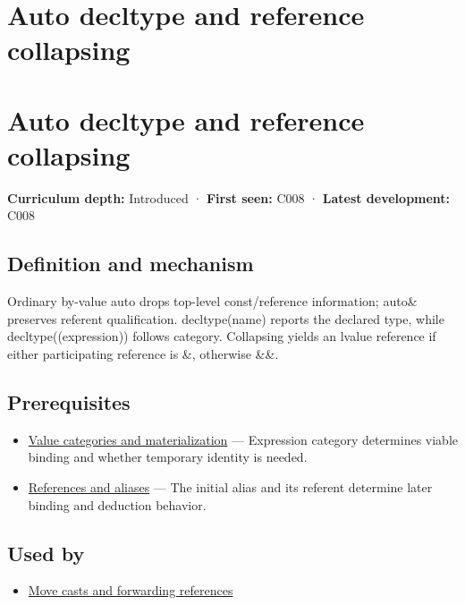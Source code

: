 \hypertarget{appendix-5d4252a42886}{}
\section*{Auto decltype and reference collapsing}
\section{Auto decltype and reference collapsing}\label{auto-decltype-and-reference-collapsing}

\textbf{Curriculum depth:} Introduced · \textbf{First seen:} C008 · \textbf{Latest development:} C008

\subsection{Definition and mechanism}\label{definition-and-mechanism}

Ordinary by-value auto drops top-level const/reference information; auto\& preserves referent qualification. decltype(name) reports the declared type, while decltype((expression)) follows category. Collapsing yields an lvalue reference if either participating reference is \&, otherwise \&\&.

\subsection{Prerequisites}\label{prerequisites}

\begin{itemize}
\tightlist
\item
  \hyperref[appendix-1121b30eaeb0]{Value categories and materialization} --- Expression category determines viable binding and whether temporary identity is needed.
\item
  \hyperref[appendix-d6d562ca9fbb]{References and aliases} --- The initial alias and its referent determine later binding and deduction behavior.
\end{itemize}

\subsection{Used by}\label{used-by}

\begin{itemize}
\tightlist
\item
  \hyperref[appendix-0104b704fb11]{Move casts and forwarding references}
\end{itemize}

